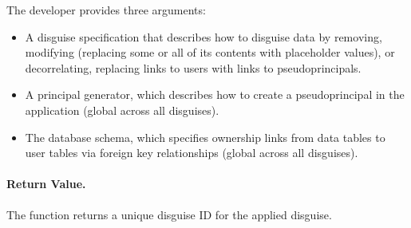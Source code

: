     The developer provides three arguments:
    \begin{itemize}[nosep]
    \item A disguise specification that describes how to disguise data by
    removing, modifying (replacing some or all of its contents with placeholder
    values), or decorrelating, replacing links to users with links to
    pseudoprincipals.
    
    \item A principal generator, which describes how to create a
    pseudoprincipal in the application (global across all disguises).
    
    \item The database schema, which specifies ownership links from data tables to user
    tables via foreign key relationships (global across all disguises).
    \end{itemize}

    \paragraph{Return Value.} 
    The function returns a unique disguise ID for the applied disguise.




\iffalse
%
(1) An application registers users with a public--private keypair
that either the application or the user's client generates; \sys stores the
public key in its database, while the user retains the private key for use in
future reveal operations.
%

%
(2) When the application wants to \xx some data, it invokes \sys with the
corresponding developer-provided \xx specification and any necessary
parameters (such as a user ID).
%
\Xx specifications can remove data, modify data (replacing some or all of its
contents with placeholder values), or decorrelate data, replacing
links to users with links to pseudoprincipals (fake users).
%
%
\sys takes the data it removed or replaced and the connections between
the user and any pseudoprincipals it created, encrypts that data with the user's
public key, and stores the resulting ciphertext---the \emph{\xxed
data}---such that it cannot be linked back to the user without the user's
private key.
%
%


%
(4) When a user wishes to reveal their \xxed data, they pass credentials
to the application, which calls into \sys to reveal the data.
%
Credentials are application-specific: users may either provide their private
key or other credentials sufficient for \sys to re-derive the private key.
%
\sys reads the \xxed data and decrypts it, undoing the changes to the
application database that \xxing introduced.
%

%
\sys provides the developer with sensible default \xxing and revealing
semantics (\eg revealing makes sure not to overwrite changes made since
\xxing).
\fi

